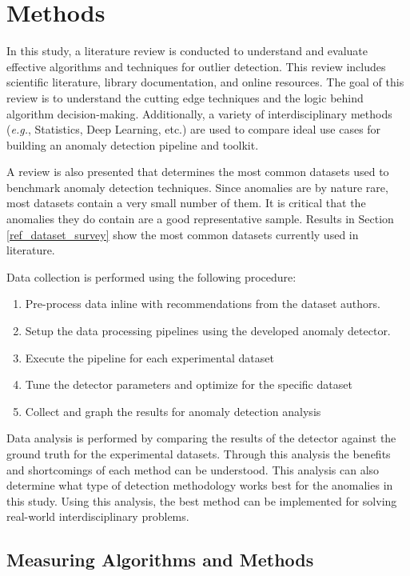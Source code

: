 \section{Methods}
\label{ref_methods}

In this study, a literature review is conducted to understand and evaluate effective algorithms and techniques for outlier detection.
This review includes scientific literature, library documentation, and online resources.
The goal of this review is to understand the cutting edge techniques and the logic behind algorithm decision-making.
Additionally, a variety of interdisciplinary methods (\textit{e.g.}, Statistics, Deep Learning, etc.) are used to compare ideal use cases for building an anomaly detection pipeline and toolkit.

A review is also presented that determines the most common datasets used to benchmark anomaly detection techniques. Since anomalies are by nature rare, most datasets contain a very small number of them. It is critical that the anomalies they do contain are a good representative sample. Results in Section \ref{ref_dataset_survey} show the most common datasets currently used in literature.

Data collection is performed using the following procedure:
\begin{enumerate}
    \item Pre-process data inline with recommendations from the dataset authors.
    \item Setup the data processing pipelines using the developed anomaly detector.
    \item Execute the pipeline for each experimental dataset
    \item Tune the detector parameters and optimize for the specific dataset
    \item Collect and graph the results for anomaly detection analysis
\end{enumerate}

Data analysis is performed by comparing the results of the detector against the ground truth for the experimental datasets. Through this analysis the benefits and shortcomings of each method can be understood. This analysis can also determine what type of detection methodology works best for the anomalies in this study. Using this analysis, the best method can be implemented for solving real-world interdisciplinary problems.

\subsection{Measuring Algorithms and Methods}

